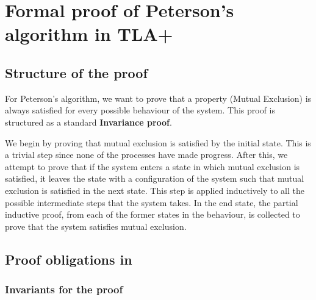 \documentclass[fleqn]{tukseminar}
\begin{document}
			
			\section{Formal proof of Peterson's algorithm in TLA+}
			\subsection{Structure of the proof}
			For Peterson's algorithm, we want to prove that a property (Mutual Exclusion) is always satisfied for every possible behaviour of the system. This proof is structured as a standard \textbf{Invariance proof}. 
			
			We begin by proving that mutual exclusion is satisfied by the initial state. This is a trivial step since none of the processes have made progress. After this, we attempt to prove that if the system enters a state in which mutual exclusion is satisfied, it leaves the state with a configuration of the system such that mutual exclusion is satisfied in the next state. This step is applied inductively to all the possible intermediate steps that the system takes. In the end state, the partial inductive proof, from each of the former states in the behaviour, is collected to prove that the system satisfies mutual exclusion. 
			
			\subsection{Proof obligations in \tla}
			\subsubsection{Invariants for the proof} 
			
\end{document}
